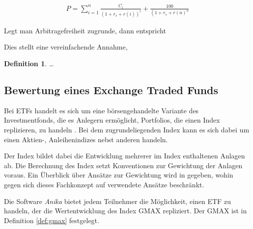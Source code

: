 \documentclass[12pt, a4paper]{article}
\theoremstyle{plain}
\newtheorem{definition}{Definition}
\begin{document}

\begin{align*}
	P=\sum_{i=1}^{n} \frac{C_{i}}{\left(1+r_{s}+r(i)\right)^{i}}+\frac{100}{\left(1+r_{s}+r(n)^{n}\right.}
\end{align*}

Legt man Arbitragefreiheit zugrunde, dann entspricht 


Dies stellt eine vereinfachende Annahme, 

\begin{definition}
	\label{def:floater}
	\dots
\end{definition}


\subsection{Bewertung eines Exchange Traded Funds}
\label{sec:bewertung_eines_exchange_traded_funds}

Bei \glspl{ETF} handelt es sich um eine börsengehandelte Variante des Investmentfonds, die es Anlegern ermöglicht, Portfolios, die einen Index replizieren, zu handeln \autocite[][S.~103]{bodie_investments_2018}. Bei dem zugrundeliegenden Index kann es sich dabei um einen Aktien-, Anleihenindizes nebst anderen handeln.

Der Index bildet dabei die Entwicklung mehrerer im Index enthaltenen Anlagen ab.
Die Berechnung des Index setzt Konventionen zur Gewichtung der Anlagen voraus. Ein Überblick über Ansätze zur Gewichtung wird in \textcite[][S.~44~ff.]{bodie_investments_2018} gegeben, wohin gegen sich dieses Fachkonzept auf verwendete Ansätze beschränkt.

Die Software \textit{Anika} bietet jedem Teilnehmer die Möglichkeit, einen ETF zu handeln, der die Wertentwicklung des Index \gls{GMAX} repliziert. Der \gls{GMAX} ist in Definition \ref{def:gmax} festgelegt.
\end{document}
